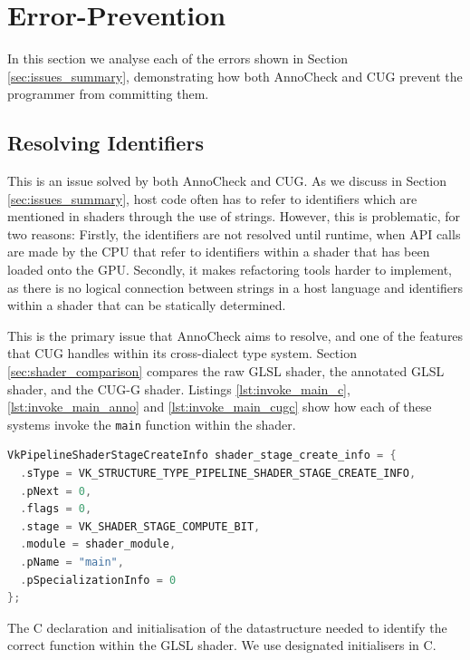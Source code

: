 \documentclass[a4paper,12pt,twoside,openright]{report}
\begin{document}
\section{Error-Prevention}

In this section we analyse each of the errors shown in Section
\ref{sec:issues_summary}, demonstrating how both AnnoCheck and CUG prevent the
programmer from committing them.

\subsection{Resolving Identifiers}

\label{sec:resolving_identifiers}

This is an issue solved by both AnnoCheck and CUG. As we discuss in Section
\ref{sec:issues_summary}, host code often has to refer to identifiers which are
mentioned in shaders through the use of strings. However, this is problematic,
for two reasons: Firstly, the identifiers are not resolved until runtime, when
API calls are made by the CPU that refer to identifiers within a shader that
has been loaded onto the GPU. Secondly, it makes refactoring tools harder to
implement, as there is no logical connection between strings in a host language
and identifiers within a shader that can be statically determined.

This is the primary issue that AnnoCheck aims to resolve, and one of the
features that CUG handles within its cross-dialect type system. Section
\ref{sec:shader_comparison} compares the raw GLSL shader, the annotated GLSL
shader, and the CUG-G shader. Listings \ref{lst:invoke_main_c},
\ref{lst:invoke_main_anno} and \ref{lst:invoke_main_cugc} show how each of
these systems invoke the \texttt{main} function within the shader.

\begin{lstfloat}
\begin{lstlisting}[language=C]
VkPipelineShaderStageCreateInfo shader_stage_create_info = {
  .sType = VK_STRUCTURE_TYPE_PIPELINE_SHADER_STAGE_CREATE_INFO,
  .pNext = 0,
  .flags = 0,
  .stage = VK_SHADER_STAGE_COMPUTE_BIT,
  .module = shader_module,
  .pName = "main",
  .pSpecializationInfo = 0
};
\end{lstlisting}
\caption{The C declaration and initialisation of the datastructure needed to
identify the correct function within the GLSL shader. We use designated initialisers
in C\cite{DesignatedInitC}.}
\label{lst:invoke_main_c}
\end{lstfloat}
\end{document}
